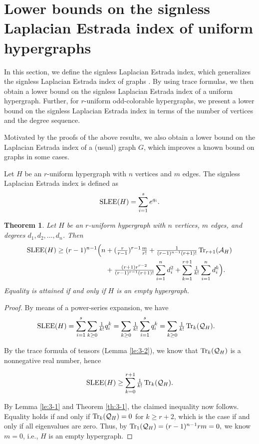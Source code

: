 \documentclass[11pt]{article}
\newtheorem{theorem}{Theorem}[section]
\def\SLEE{\mathop{\rm SLEE }\nolimits}
\def\Tr{\mathop{\rm Tr }\nolimits}
\begin{document}
\section{Lower bounds on the signless Laplacian Estrada index of uniform hypergraphs}
\label{sec:ch-inco}
In this section, we define the signless Laplacian Estrada index, which generalizes the signless Laplacian Estrada index of graphs \cite{ABVG}. By using trace formulas, we then obtain a lower bound on the signless Laplacian Estrada index of a uniform hypergraph. Further, for $r$-uniform odd-colorable hypergraphs, we present a lower bound on the signless Laplacian Estrada index in terms of the number of vertices and the degree sequence.

Motivated by the proofs of the above results, we also obtain a lower bound on the Laplacian Estrada index of a (usual) graph $G$, which improves a known bound on graphs in some cases.

Let $H$ be an $r$-uniform hypergraph with $n$ vertices and $m$ edges. The signless Laplacian Estrada index is defined as $$\SLEE(H)=\sum_{i=1}^{s}e^{q_{i}}.$$

\noindent\begin{theorem}\label{th:4-1}
Let $H$ be an $r$-uniform hypergraph with $n$ vertices, $m$ edges, and degrees $d_{1}, d_{2} ,\ldots, d_{n}$. Then
\begin{align*}
\SLEE(H) \geq (r-1)^{n-1}\Big(n&+(\tfrac{r}{r-1})^{r-1}\tfrac{m}{r!}+\tfrac{1}{(r-1)^{n-1}(r+1)!}\Tr_{r+1}(\mathcal{A}_{H})
\\&+\tfrac{(r+1)r^{r-2}}{(r-1)^{r-1}(r+1)!}\sum_{i=1}^{n}d_{i}^{2}+\sum_{k=1}^{r+1}\tfrac{1}{k!}\sum_{i=1}^{n}d_{i}^{k}\Big).
\end{align*}
Equality is attained if and only if $H$ is an empty hypergraph.
\end{theorem}

\begin{proof}  By means of a power-series expansion, we have
\begin{align*}
\SLEE(H)&=\sum_{i=1}^{s}\sum_{k\geq 0}\tfrac{1}{k!}q_{i}^{k}=\sum_{k\geq 0}\tfrac{1}{k!}\sum\limits_{i=1}^{s}q_{i}^{k}=\sum_{k\geq 0}\tfrac{1}{k!}\Tr_{k}(\mathcal{Q}_{H}).
\end{align*}

By the trace formula of tensors (Lemma \ref{le:3-2}), we know that $\Tr_{k}(\mathcal{Q}_{H})$ is a nonnegative real number, hence

$$\SLEE(H) \geq \sum_{k= 0}^{r+1}\tfrac{1}{k!}\Tr_{k}(\mathcal{Q}_{H}).$$

By Lemma \ref{le:3-1} and Theorem \ref{th:3-1}, the claimed inequality now follows.
Equality holds if and only if $\Tr_{k}(\mathcal{Q}_{H})=0$ for $k\geq r+2$, which is the case if and only if all eigenvalues are zero. %
Thus, by $\Tr_{1}(\mathcal{Q}_{H})=(r-1)^{n-1}rm=0,$ we know $m=0$, i.e., $H$ is an empty hypergraph.
\end{proof}
\end{document}
